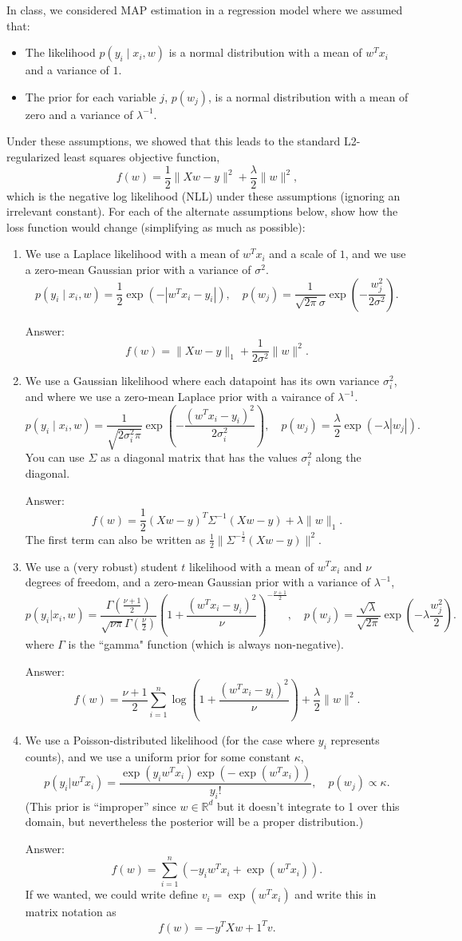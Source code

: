 \documentclass{article}
\def\ans#1{\par\gre{Answer: #1}}
\def\blu#1{{\color{blu}#1}}
\def\gre#1{{\color{gre}#1}}
\def\norm#1{\|#1\|}
\def\R{\mathbb{R}}
\def\half{\frac 1 2}
\def\items#1{\begin{itemize}#1\end{itemize}}
\def\enum#1{\begin{enumerate}#1\end{enumerate}}
\begin{document}
In class, we considered MAP estimation in a regression model where we assumed that:
\items{
\item The likelihood $p(y_i \mid x_i, w)$ is a normal distribution with a mean of $w^Tx_i$ and a variance of $1$.
\item The prior for each variable $j$, $p(w_j)$, is a normal distribution with a mean of zero and a variance of $\lambda^{-1}$.
}
Under these assumptions, we showed that this leads to the standard L2-regularized least squares objective function,
\[
f(w) = \frac{1}{2}\norm{Xw - y}^2 + \frac \lambda 2 \norm{w}^2,
\]
which is the negative log likelihood (NLL) under these assumptions (ignoring an irrelevant constant).
\blu{For each of the alternate assumptions below, show how the loss function would change} (simplifying as much as possible):
\enum{
\item We use a Laplace likelihood with a mean of $w^Tx_i$ and a scale of $1$, and we use a zero-mean Gaussian prior with a variance of $\sigma^2$.
\[
p(y_i \mid x_i, w) = \frac 1 2 \exp(-|w^Tx_i - y_i|), \quad p(w_j) = \frac{1}{\sqrt{2\pi}\sigma}\exp\left(-\frac{w_j^2}{2\sigma^2}\right).
\]
\ans{
\[
f(w) = \norm{Xw - y}_1 + \frac{1}{2\sigma^2}\norm{w}^2.
\]
}
\item We use a Gaussian likelihood where each datapoint has its own variance $\sigma_i^2$, and where we use a zero-mean Laplace prior with a vairance of $\lambda^{-1}$.
\[
p(y_i \mid x_i,w) = \frac{1}{\sqrt{2\sigma_i^2\pi}}\exp\left(-\frac{(w^Tx_i - y_i)^2}{2\sigma_i^2}\right), \quad p(w_j) = \frac{\lambda}{2}\exp(-\lambda|w_j|).
\]
You can use $\Sigma$ as a diagonal matrix that has the values $\sigma_i^2$ along the diagonal.
\ans{
\[
f(w) = \frac{1}{2}(Xw - y)^T\Sigma^{-1}(Xw - y) + \lambda\norm{w}_1.
\]
The first term can also be written as $\half\norm{\Sigma^{-\half}(Xw-y)}^2$.
}
 \item We use a (very robust) student $t$ likelihood with a mean of $w^Tx_i$ and $\nu$ degrees of freedom, and a zero-mean Gaussian prior with a variance of $\lambda^{-1}$,
\[
p(y_i | x_i, w) = \frac{\Gamma\left(\frac{\nu + 1}{2}\right)}{\sqrt{\nu\pi}\Gamma\left(\frac \nu 2\right)}\left(1 + \frac{(w^Tx_i - y_i)^2}{\nu}\right)^{-\frac{\nu+1}{2}}, \quad p(w_j) = \frac{\sqrt{\lambda}}{\sqrt{2\pi}}\exp\left(-\lambda\frac{w_j^2}{2}\right).
\]
where $\Gamma$ is the ``gamma" function (which is always non-negative).
\ans{
\[
f(w) = \frac{\nu+1}{2}\sum_{i=1}^n \log\left(1 + \frac{(w^Tx_i - y_i)^2}{\nu}\right) + \frac \lambda 2 \norm{w}^2.
\]
}
\item We use a Poisson-distributed likelihood (for the case where $y_i$ represents counts), and we use a uniform prior for some constant $\kappa$,
\[
p(y_i | w^Tx_i) = \frac{\exp(y_iw^Tx_i)\exp(-\exp(w^Tx_i))}{y_i!}, \quad p(w_j) \propto \kappa.
\]
(This prior is 	``improper'' since $w\in\R^d$ but it doesn't integrate to 1 over this domain, but nevertheless the posterior will be a proper distribution.)
\ans{\[
f(w) = \sum_{i=1}^n \left( -y_iw^Tx_i + \exp(w^Tx_i)\right).
\]
If we wanted, we could write define $v_i = \exp(w^Tx_i)$ and write this in matrix notation as
\[
f(w) = -y^TXw + 1^Tv.
\]
}
}
\end{document}
